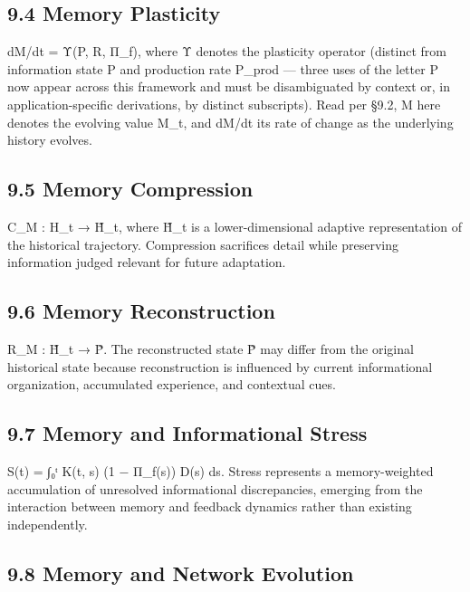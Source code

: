 \documentclass[
]{article}
\begin{document}
\hypertarget{memory-plasticity}{%
\subsection{9.4 Memory Plasticity}\label{memory-plasticity}}

dM/dt = Υ(P, R, Π\_f), where Υ denotes the plasticity operator (distinct
from information state P and production rate P\_prod --- three uses of
the letter P now appear across this framework and must be disambiguated
by context or, in application-specific derivations, by distinct
subscripts). Read per §9.2, M here denotes the evolving value M\_t, and
dM/dt its rate of change as the underlying history evolves.

\hypertarget{memory-compression}{%
\subsection{9.5 Memory Compression}\label{memory-compression}}

C\_M : H\_t → H̃\_t, where H̃\_t is a lower-dimensional adaptive
representation of the historical trajectory. Compression sacrifices
detail while preserving information judged relevant for future
adaptation.

\hypertarget{memory-reconstruction}{%
\subsection{9.6 Memory Reconstruction}\label{memory-reconstruction}}

R\_M : H̃\_t → P̃. The reconstructed state P̃ may differ from the original
historical state because reconstruction is influenced by current
informational organization, accumulated experience, and contextual cues.

\hypertarget{memory-and-informational-stress}{%
\subsection{9.7 Memory and Informational
Stress}\label{memory-and-informational-stress}}

S(t) = ∫₀ᵗ K(t, s) (1 − Π\_f(s)) D(s) ds. Stress represents a
memory-weighted accumulation of unresolved informational discrepancies,
emerging from the interaction between memory and feedback dynamics
rather than existing independently.

\hypertarget{memory-and-network-evolution}{%
\subsection{9.8 Memory and Network
Evolution}\label{memory-and-network-evolution}}
\end{document}
